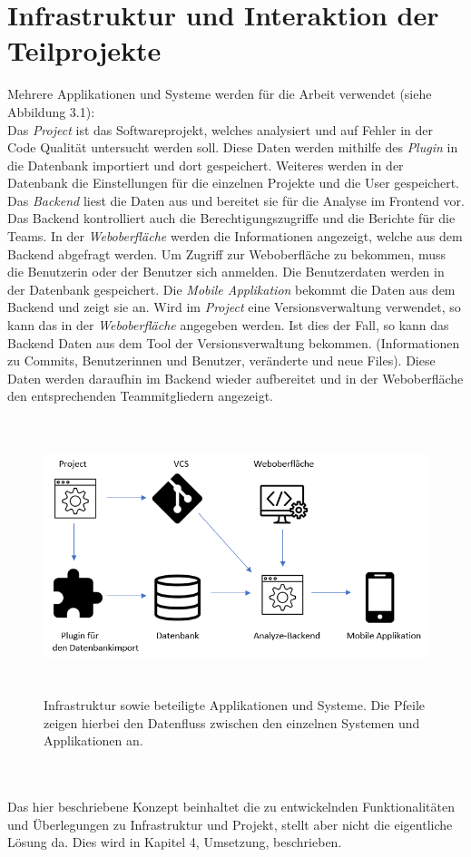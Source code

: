 \section{Infrastruktur und Interaktion der Teilprojekte}
Mehrere Applikationen und Systeme werden für die Arbeit verwendet (siehe Abbildung 3.1): \\
Das \textit{Project} ist das Softwareprojekt, welches analysiert und auf Fehler in der Code Qualität untersucht werden soll. Diese Daten werden mithilfe des \textit{Plugin} in die Datenbank importiert und dort gespeichert. Weiteres werden in der Datenbank die Einstellungen für die einzelnen Projekte und die User gespeichert. Das \textit{Backend} liest die Daten aus und bereitet sie für die Analyse im Frontend vor. Das Backend kontrolliert auch die Berechtigungszugriffe und die Berichte für die Teams. In der \textit{Weboberfläche} werden die Informationen angezeigt, welche aus dem Backend abgefragt werden. Um Zugriff zur Weboberfläche zu bekommen, muss die Benutzerin oder der Benutzer sich anmelden. Die Benutzerdaten werden in der Datenbank gespeichert.
Die \textit{Mobile Applikation} bekommt die Daten aus dem Backend und zeigt sie an. Wird im \textit{Project} eine Versionsverwaltung verwendet, so kann das in der \textit{Weboberfläche} angegeben werden. Ist dies der Fall, so kann das Backend Daten aus dem Tool der Versionsverwaltung bekommen. (Informationen zu Commits, Benutzerinnen und Benutzer, veränderte und neue Files). Diese Daten werden daraufhin im Backend wieder aufbereitet und in der Weboberfläche den entsprechenden Teammitgliedern angezeigt.
\begin{figure}[tp]
  \centering
  \includegraphics[height=8cm]{images/infrastruktur.PNG}
 \caption[Infrastruktur und beteiligte Applikationen und Systeme]{Infrastruktur sowie beteiligte Applikationen und Systeme. Die Pfeile zeigen hierbei den Datenfluss zwischen den einzelnen Systemen und Applikationen an.}
  \label{fig:findingsInIDE}
\end{figure}
\\ \\ Das hier beschriebene Konzept beinhaltet die zu entwickelnden Funktionalitäten und Überlegungen zu Infrastruktur und Projekt, stellt aber nicht die eigentliche Lösung da. Dies wird in Kapitel 4, Umsetzung, beschrieben.
\chapterend